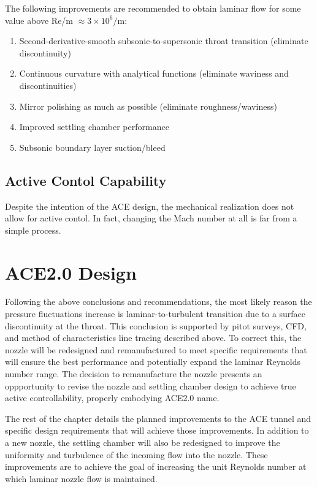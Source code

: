 The following improvements are recommended to obtain laminar flow for some value above Re/m $\approx 3 \times 10^6/\mathrm{m}$:
\begin{enumerate}
    \item Second-derivative-smooth subsonic-to-supersonic throat transition (eliminate discontinuity)
    \item Continuous curvature with analytical functions (eliminate waviness and discontinuities)
    \item Mirror polishing as much as possible (eliminate roughness/waviness)
    \item Improved settling chamber performance
    \item Subsonic boundary layer suction/bleed
\end{enumerate}

\subsection{Active Contol Capability}

Despite the intention of the ACE design, the mechanical realization does not allow for active contol. In fact, changing the Mach number at all is far from a simple process. 

\section{ACE2.0 Design}

Following the above conclusions and recommendations, the most likely reason the pressure fluctuations increase is laminar-to-turbulent transition due to a surface discontinuity at the throat. This conclusion is supported by pitot surveys, CFD, and method of characteristics line tracing described above. To correct this, the nozzle will be redesigned and remanufactured to meet specific requirements that will ensure the best performance and potentially expand the laminar Reynolds number range. The decision to remanufacture the nozzle presents an oppportunity to revise the nozzle and settling chamber design to achieve true active controllability, properly embodying ACE2.0 name.

The rest of the chapter details the planned improvements to the ACE tunnel and specific design requirements that will achieve those improvements. In addition to a new nozzle, the settling chamber will also be redesigned to improve the uniformity and turbulence of the incoming flow into the nozzle. These improvements are to achieve the goal of increasing the unit Reynolds number at which laminar nozzle flow is maintained.

